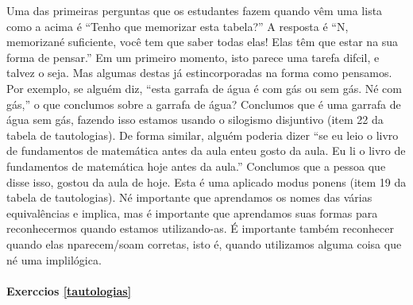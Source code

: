 Uma das primeiras perguntas que os estudantes fazem quando v\^em uma lista como a acima \'e ``Tenho que memorizar esta tabela?'' A resposta \'e ``N\aoi, memoriza\cao n\ao \'e suficiente, voc\^e tem que saber todas elas! Elas t\^em que estar na sua forma de pensar.'' Em um primeiro momento, isto parece uma tarefa dif\ih cil, e talvez o seja. Mas algumas destas j\'a est\ao incorporadas na forma como pensamos. Por exemplo, se algu\'em diz, ``esta garrafa de \'agua \'e com g\'as ou sem g\'as. N\ao \'e com g\'as,'' o que conclu\ih mos sobre a garrafa de \'agua? Conclu\ih mos que \'e uma garrafa de \'agua sem g\'as, fazendo isso estamos usando o silogismo disjuntivo (item 22 da tabela de tautologias). De forma similar, algu\'em poderia dizer ``se eu leio o livro de fundamentos de matem\'atica antes da aula ent\ao eu gosto da aula. Eu li o livro de fundamentos de matem\'atica hoje antes da aula.'' Conclu\ih mos que a pessoa que disse isso, gostou da aula de hoje. Esta \'e uma aplica\cao do modus ponens (item 19 da tabela de tautologias). N\ao \'e importante que aprendamos os nomes das v\'arias equival\^encias e implica\cois, mas \'e importante que aprendamos suas formas para reconhecermos quando estamos utilizando-as. \'E importante tamb\'em reconhecer quando elas n\ao parecem/soam corretas, isto \'e, quando utilizamos alguma coisa que n\ao \'e uma impli\cao l\'ogica.



\paragraph{Exerc\ih cios \ref{tautologias}}

